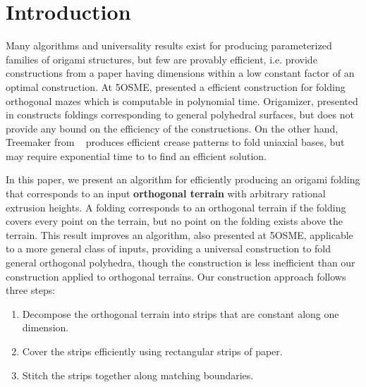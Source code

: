 \section{Introduction}
\label{sec:introduction}

Many algorithms and universality results exist for producing parameterized
families of origami structures, but few are provably efficient, i.e. provide
constructions from a paper having dimensions within a low constant factor of an
optimal construction. At 5OSME, \cite{MazeFolding_Origami5} presented a
efficient construction for folding orthogonal mazes which is computable in
polynomial time. Origamizer, presented in \cite{Origamizer_SoCG2017} constructs
foldings corresponding to general polyhedral surfaces, but does not provide any
bound on the efficiency of the constructions. On the other hand, Treemaker from
~\cite{Lang} produces efficient crease patterns to fold uniaxial bases, but may
require exponential time to to find an efficient solution. 

In this paper, we present an algorithm for efficiently producing an origami
folding that corresponds to an input {\bf orthogonal terrain} with arbitrary
rational extrusion heights. A folding corresponds to an orthogonal terrain if
the folding covers every point on the terrain, but no point on the folding
exists above the terrain. This result improves an algorithm,
\cite{BoxPleating_Origami5} also presented at 5OSME, applicable to a more
general class of inputs, providing a universal construction to fold general
orthogonal polyhedra, though the construction is less inefficient than our
construction applied to orthogonal terrains. Our construction approach follows
three steps: 

\vspace{-0.2pc} 
\begin{enumerate} 
\item Decompose the orthogonal terrain into strips that are constant along one dimension.
\item Cover the strips efficiently using rectangular strips of paper.
\item Stitch the strips together along matching boundaries.
\end{enumerate}
\vspace{-0.2pc}

